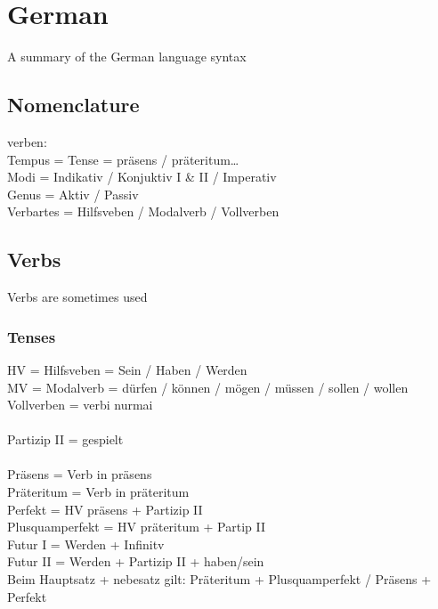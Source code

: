\section{German}

A summary of the German language syntax

\subsection{Nomenclature}
verben:\\
Tempus = Tense = präsens / präteritum\dots\\
Modi = Indikativ / Konjuktiv I \& II / Imperativ\\
Genus = Aktiv / Passiv\\
Verbartes = Hilfsveben / Modalverb / Vollverben

\subsection{Verbs}

Verbs are sometimes used

\subsubsection{Tenses}

HV = Hilfsveben = Sein / Haben / Werden \\
MV = Modalverb = dürfen / können / mögen / müssen / sollen / wollen \\
Vollverben = verbi nurmai \\
\\
Partizip II = gespielt \\
\\
Präsens = Verb in präsens \\
Präteritum = Verb in präteritum \\
Perfekt = HV präsens + Partizip II \\
Plusquamperfekt = HV präteritum + Partip II \\
Futur I = Werden + Infinitv \\
Futur II = Werden + Partizip II + haben/sein \\

Beim Hauptsatz + nebesatz gilt: Präteritum + Plusquamperfekt / Präsens + Perfekt

